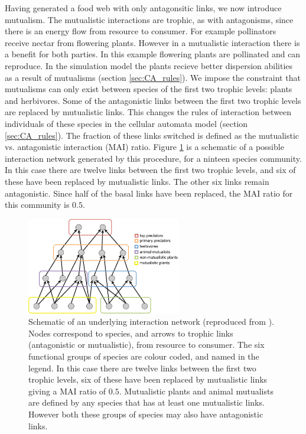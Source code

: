 Having generated a food web with only antagonsitic links, we now introduce mutualism. The mutualistic interactions are trophic, as with antagonisms, since there is an energy flow from resource to consumer. For example pollinators receive nectar from flowering plants. However in a mutualistic interaction there is a benefit for both parties. In this example flowering plants are pollinated and can reproduce. In the simulation model the plants recieve better dispersion abilities as a result of mutualisms (section \ref{sec:CA_rules}). We impose the constraint that mutualisms can only exist between species of the first two trophic levels: plants and herbivores. Some of the antagonistic links between the first two trophic levels are replaced by mutualistic links. This changes the rules of interaction between individuals of these species in the cellular automata model (section \ref{sec:CA_rules}). The fraction of these links switched is defined as the mutualistic vs. antagonistic interaction (MAI) ratio. Figure \ref{fig:trophic_cartoon} is a schematic of a possible interaction network generated by this procedure, for a ninteen species community. In this case there are twelve links between the first two trophic levels, and six of these have been replaced by mutualistic links. The other six links remain antagonistic. Since half of the basal links have been replaced, the MAI ratio for this community is $0.5$.

\begin{figure}
	\centering
	\includegraphics[width=0.6\textwidth]{"diagrams/trophic_cartoon"}
	\caption{Schematic of an underlying interaction network (reproduced from \cite{lurgi2015effects}). Nodes correspond to species, and arrows to trophic links (antagonistic or mutualistic), from resource to consumer. The six functional groups of species are colour coded, and named in the legend. In this case there are twelve links between the first two trophic levels, six of these have been replaced by mutualistic links giving a MAI ratio of $0.5$. Mutualistic plants and animal mutualists are defined by any species that has at least one mutualistic links. However both these groups of species may also have antagonistic links.}
	\label{fig:trophic_cartoon}
\end{figure}

